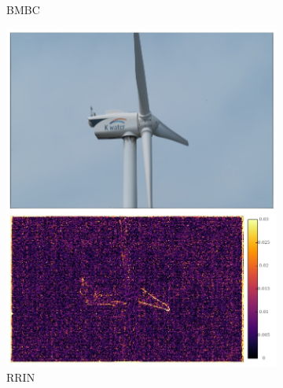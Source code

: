 \documentclass{article}
\begin{document}
\begin{figure}[h]
\begin{subfigure}{0.14\textwidth}
    \caption{BMBC}
\end{subfigure}%
\begin{subfigure}{0.14\textwidth}
	\centering
    \includegraphics[width=1\linewidth]{qua_imgs/TEST02_045_f0465_rrin.jpg}
    \caption{RRIN}
\end{subfigure}%
\begin{subfigure}{0.14\textwidth}
	\centering

\end{subfigure}
\end{figure}
\end{document}
